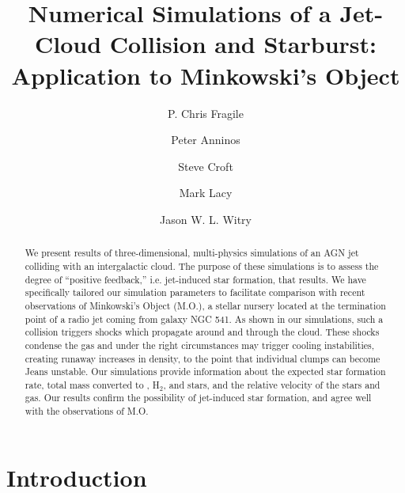 \documentclass{aastex6}
\begin{document}

\title{Numerical Simulations of a Jet-Cloud Collision and Starburst:  Application to Minkowski's Object}
\author{P. Chris Fragile}
\author{Peter Anninos}
\author{Steve Croft}
\author{Mark Lacy}
\author{Jason W. L.  Witry}

\begin{abstract}
We present results of three-dimensional, multi-physics simulations of an AGN jet colliding with an intergalactic cloud.  The purpose of these simulations is to assess the degree of ``positive feedback,'' i.e. jet-induced star formation, that results.  We have specifically tailored our simulation parameters to facilitate comparison with recent observations of Minkowski's Object (M.O.), a stellar nursery located at the termination point of a radio jet coming from galaxy NGC 541.  As shown in our simulations, such a collision triggers shocks which propagate around and through the cloud.  These shocks condense the gas and under the right circumstances may trigger cooling instabilities, creating runaway increases in density, to the point that individual clumps can become Jeans unstable.  Our simulations provide information about the expected star formation rate, total mass converted to , H$_2$, and stars, and the relative velocity of the stars and gas.  Our results confirm the possibility of jet-induced star formation, and agree well with the observations of M.O.  
\end{abstract}
\maketitle


\section{Introduction}
\end{document}

